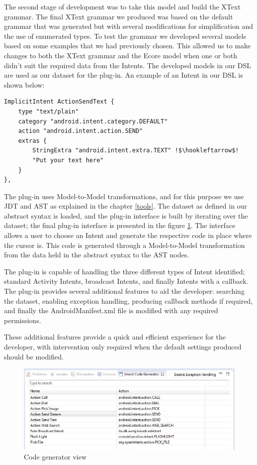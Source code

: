 The second stage of development was to take this model and build the XText grammar. The final XText grammar we produced was based on the default grammar that was generated but with several modifications for simplification and the use of enumerated types. To test the grammar we developed several models based on some examples that we had previously chosen. This allowed us to make changes to both the XText grammar and the Ecore model when one or both didn't suit the required data from the Intents. The developed models in our DSL are used as our dataset for the plug-in. An example of an Intent in our DSL is shown below:

{\footnotesize\begin{lstlisting}[escapechar=!]
ImplicitIntent ActionSendText {
	type "text/plain"
	category "android.intent.category.DEFAULT"
	action "android.intent.action.SEND"
	extras {
		StringExtra "android.intent.extra.TEXT" !$\hookleftarrow$!
		"Put your text here"
	}
},
\end{lstlisting}}

The plug-in uses Model-to-Model transformations, and for this purpose we use JDT and AST as explained in the chapter \ref{tools}. The dataset as defined in our abstract syntax is loaded, and the plug-in interface is built by iterating over the dataset; the final plug-in interface is presented in the figure \ref{codegeneratorview}. The interface allows a user to choose an Intent and generate the respective code in place where the cursor is. This code is generated through a Model-to-Model transformation from the data held in the abstract syntax to the AST nodes.

The plug-in is capable of handling the three different types of Intent identified; standard Activity Intents, broadcast Intents, and finally Intents with a callback. The plug-in provides several additional features to aid the developer: searching the dataset, enabling exception handling, producing callback methods if required, and finally the AndroidManifest.xml file is modified with any required permissions.

These additional features provide a quick and efficient experience for the developer, with intervention only required when the default settings produced should be modified.

\begin{figure}[H]
\label{codegeneratorview}
  \centering
    \includegraphics[width=\textwidth]{codegenerator}
  \caption{Code generator view}
\end{figure}


